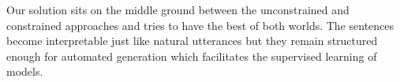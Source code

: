 Our solution sits on the middle ground between the unconstrained and constrained
approaches and tries to have the best of both worlds. The sentences become
interpretable just like natural utterances but they remain structured enough for
automated generation which facilitates the supervised learning of models.
